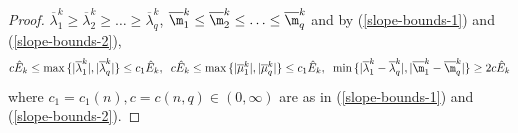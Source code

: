 \documentclass[a4paper,11pt]{amsart}
\begin{document}
\begin{proof}
$\overline{\lambda}^{k}_{1} \geq \overline{\lambda}^{k}_{2}\geq \ldots \geq \overline{\lambda}^{k}_{q}$, 
$\overline{\m}^{k}_{1} \leq \overline{\m}^{k}_{2}\leq \ldots \leq \overline{\m}^{k}_{q}$ and by (\ref{slope-bounds-1}) and (\ref{slope-bounds-2}), 
\begin{equation}\label{L2-est-2-14}
c{\hat E}_{k} \leq \max \, \{|\overline{\lambda}_{1}^{k}|, |\overline{\lambda}_{q}^{k}|\} \leq c_{1}{\hat E}_{k}, \;\; c{\hat E}_{k} \leq \max \, \{|\overline{\mu}_{1}^{k}|, |\overline{\mu}_{q}^{k}|\} \leq c_{1}{\hat E}_{k}, \;\; \min \, \{|\overline{\lambda}_{1}^{k} - \overline{\lambda}_{q}^{k}|, |\overline{\m}_{1}^{k} - \overline{\m}_{q}^{k}|\} \geq  2c{\hat E}_{k}
\end{equation}
where $c_{1} = c_{1}(n), c = c(n, q) \in (0, \infty)$ are as in (\ref{slope-bounds-1}) and (\ref{slope-bounds-2}). 


\end{proof}
\end{document}
